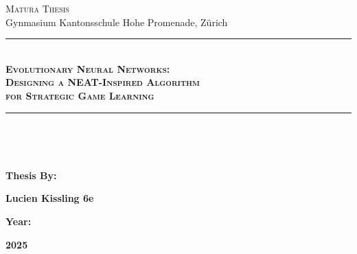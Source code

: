 \documentclass[12pt]{report}
\begin{document}
    \begin{titlepage}
        \BgThispage
        \color{white} {
            \begin{center}
                \Large \textsc{Matura Thesis}\\Gynmasium Kantonsschule Hohe Promenade, Zürich\\
                \rule[0.1cm]{16.5cm}{0.1mm}\\
                \vspace{3cm}
                \Huge \textbf{ \textsc{Evolutionary Neural Networks: \\Designing a NEAT-Inspired Algorithm \\for Strategic Game Learning}}\\
                \vspace{3cm}
                \rule[0.1cm]{16.5cm}{0.1mm}\\
            \end{center}
            \vspace{10cm}\\
            \begin{minipage}[t]{0.47\textwidth}
                \large\textbf {Thesis By:}\\
            \end{minipage}
            \hfill
            \begin{minipage}[t]{0.47\textwidth}
                \raggedleft
                \large\textbf {Lucien Kissling 6e}\\
            \end{minipage}
            \begin{minipage}[t]{0.47\textwidth}
                \large \textbf {Year:}\\
            \end{minipage}
            \hfill
            \begin{minipage}[t]{0.47\textwidth}
                \raggedleft
                \large \textbf {2025}\\
            \end{minipage}
            \begin{minipage}[t]{0.47\textwidth}

\end{minipage}}
\end{titlepage}
\end{document}
